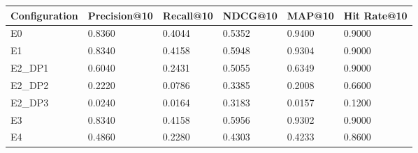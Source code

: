 \begin{tabular}{llllll}
\toprule
Configuration & Precision@10 & Recall@10 & NDCG@10 & MAP@10 & Hit Rate@10 \\
\midrule
E0 & 0.8360 & 0.4044 & 0.5352 & 0.9400 & 0.9000 \\
E1 & 0.8340 & 0.4158 & 0.5948 & 0.9304 & 0.9000 \\
E2_DP1 & 0.6040 & 0.2431 & 0.5055 & 0.6349 & 0.9000 \\
E2_DP2 & 0.2220 & 0.0786 & 0.3385 & 0.2008 & 0.6600 \\
E2_DP3 & 0.0240 & 0.0164 & 0.3183 & 0.0157 & 0.1200 \\
E3 & 0.8340 & 0.4158 & 0.5956 & 0.9302 & 0.9000 \\
E4 & 0.4860 & 0.2280 & 0.4303 & 0.4233 & 0.8600 \\
\bottomrule
\end{tabular}
